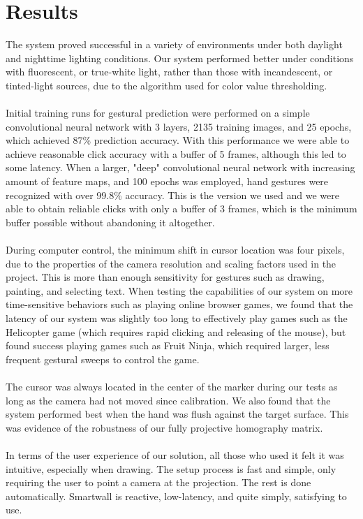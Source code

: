 \documentclass[twoside,twocolumn]{article}
\begin{document}
\section{Results}
The system proved successful in a variety of environments under both daylight and nighttime lighting conditions. Our system performed better under conditions with fluorescent, or true-white light, rather than those with incandescent, or tinted-light sources, due to the algorithm used for color value thresholding. \\ \\Initial training runs for gestural prediction were performed on a simple convolutional neural network with 3 layers, 2135 training images, and 25 epochs, which achieved 87\% prediction accuracy. With this performance we were able to achieve reasonable click accuracy with a buffer of 5 frames, although this led to some latency. When a larger, "deep" convolutional neural network with increasing amount of feature maps, and 100 epochs was employed, hand gestures were recognized with over 99.8\% accuracy. This is the version we used and we were able to obtain reliable clicks with only a buffer of 3 frames, which is the minimum buffer possible without abandoning it altogether. \\ \\ During computer control, the minimum shift in cursor location was four pixels, due to the properties of the camera resolution and scaling factors used in the project. This is more than enough sensitivity for gestures such as drawing, painting, and selecting text. When testing the capabilities of our system on more time-sensitive behaviors such as playing online browser games, we found that the latency of our system was slightly too long to effectively play games such as the Helicopter game (which requires rapid clicking and releasing of the mouse), but found success playing games such as Fruit Ninja, which required larger, less frequent gestural sweeps to control the game.\\ \\
The cursor was always located in the center of the marker during our tests as long as the camera had not moved since calibration. We also found that the system performed best when the hand was flush against the target surface. This was evidence of the robustness of our fully projective homography matrix.\\ \\
In terms of the user experience of our solution, all those who used it felt it was intuitive, especially when drawing. The setup process is fast and simple, only requiring the user to point a camera at the projection. The rest is done automatically. Smartwall is reactive, low-latency, and quite simply, satisfying to use.
\end{document}
